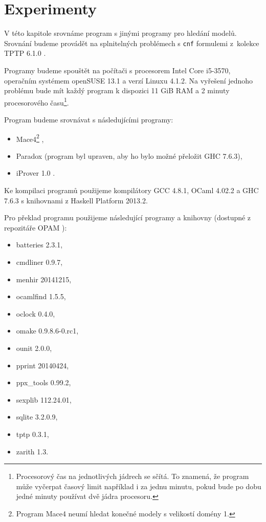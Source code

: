 \chapter{Experimenty}

V této kapitole srovnáme program \crossbow{} s jinými programy
pro hledání modelů. Srovnání budeme provádět na splnitelných problémech
s \texttt{cnf} formulemi z~kolekce TPTP 6.1.0 \cite{sutcliffe2009tptp}.

Programy budeme spouštět na počítači s procesorem
Intel Core i5-3570, ope\-račním systémem openSUSE 13.1 a
verzí Linuxu 4.1.2. Na vyřešení jednoho problému bude mít
každý program k dispozici 11 GiB RAM a 2 minuty procesorového
času\footnote{Procesorový čas na jednotlivých jádrech se sčítá. To
znamená, že program může vyčerpat časový limit například i za jednu minutu,
pokud bude po dobu jedné minuty používat dvě jádra procesoru.}.

Program \crossbow{} budeme srovnávat s následujícími programy:
\begin{itemize}
\item Mace4\footnote{Program Mace4 neumí hledat
  konečné modely s velikostí domény 1.} \cite{mccune03mace4},
\item Paradox \cite{paradox} (program byl upraven,
  aby ho bylo možné přeložit GHC 7.6.3),
\item iProver 1.0 \cite{iprover}.
\end{itemize}
Ke kompilaci programů použijeme kompilátory GCC 4.8.1,
OCaml 4.02.2 a GHC 7.6.3 s knihovnami z Haskell Platform 2013.2.

Pro překlad programu \crossbow{} použijeme následující programy
a knihovny (dostupné z repozitáře OPAM \cite{opam}):
\begin{itemize}
\item batteries 2.3.1,
\item cmdliner 0.9.7,
\item menhir 20141215,
\item ocamlfind 1.5.5,
\item oclock 0.4.0,
\item omake 0.9.8.6-0.rc1,
\item ounit 2.0.0,
\item pprint 20140424,
\item ppx\_tools 0.99.2,
\item sexplib 112.24.01,
\item sqlite 3.2.0.9,
\item tptp 0.3.1,
\item zarith 1.3.
\end{itemize}

